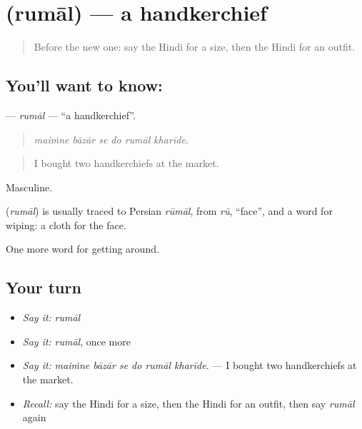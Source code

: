 \section[\texorpdfstring{\hi{रुमाल} (rumāl)}{रुमाल (rumāl)}]{ (rumāl) — a handkerchief}

\label{lesson:HI-C435-rumal}



\begin{quote}
Before the new one: say the Hindi for a size, then the Hindi for an outfit.
\end{quote}

\subsection*{You'll want to know: }
\textbf{} — \emph{rumāl} — \textquotedblleft{}a handkerchief\textquotedblright{}.

\begin{quote}
     
\end{quote}

\begin{quote}
\emph{maiṁne bāzār se do rumāl kharīde.}
\end{quote}

\begin{quote}
I bought two handkerchiefs at the market.
\end{quote}

Masculine.

\begin{cousinweb}
\textbf{} (\emph{rumāl}) is usually traced to Persian \emph{rūmāl}, from \emph{rū}, \textquotedblleft{}face\textquotedblright{}, and a word for wiping: a cloth for the face.
\end{cousinweb}

\begin{grammarlens}[title={What you've built}]
One more word for getting around.
\end{grammarlens}

\subsection*{Your turn}
\begin{itemize}
\raggedright
  \item \emph{Say it:} \emph{rumāl}
  \item \emph{Say it:} \emph{rumāl}, once more
  \item \emph{Say it:} \emph{maiṁne bāzār se do rumāl kharīde.} — I bought two handkerchiefs at the market.
  \item \emph{Recall:} say the Hindi for a size, then the Hindi for an outfit, then say \emph{rumāl} again
\end{itemize}

